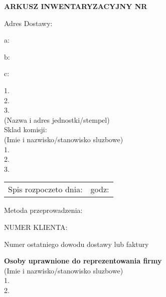\documentclass[8pt]{article}
\begin{document}
\begin{center}
{\large{\bf ARKUSZ INWENTARYZACYJNY NR}}
\end{center}

\begin{multicols}{2}

Adres Dostawy:

a: %

b: %

c: %

\vspace{10mm}

1. \dotfill \\


2. \dotfill \\


3. \dotfill \\

\vspace{-5mm}
{\tiny(Nazwa i adres jednostki/stempel)} \\

Sklad komisji: \\
{\tiny (Imie i nazwisko/stanowisko sluzbowe)} \\

1. \dotfill \\


2. \dotfill \\


3. \dotfill \\

\begin{tabularx}{\textwidth}{l l}
Spis rozpoczeto dnia: \dotfill & godz: \dotfill \\
\end{tabularx}

\columnbreak

Metoda przeprowadzenia: %

NUMER KLIENTA: %

\vspace{30mm}

Numer ostatniego dowodu dostawy lub faktury \dotfill

\vspace{5mm}

{\bf Osoby uprawnione do reprezentowania firmy}\\
{\tiny(Imie i nazwisko/stanowisko sluzbowe)} \\

1. \dotfill \\

2. \dotfill \\

\end{multicols}
\end{document}
